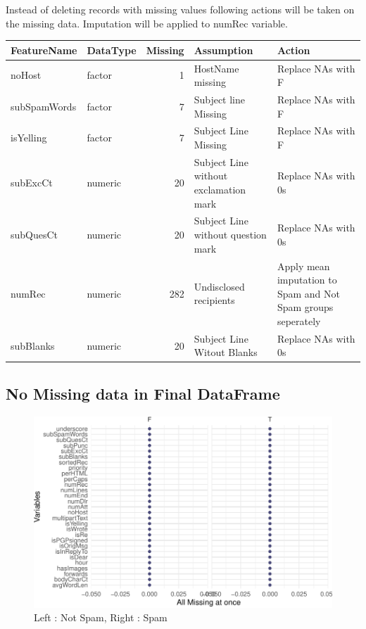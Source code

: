 \documentclass[
]{article}
\begin{document}
Instead of deleting records with missing values following actions will
be taken on the missing data. Imputation will be applied to numRec
variable.

\begin{table}[H]
\centering
\begin{tabular}[t]{llrl>{\raggedright\arraybackslash}p{15em}}
\toprule
FeatureName & DataType & Missing & Assumption & Action\\
\midrule
noHost & factor & 1 & HostName missing & Replace NAs with F\\
subSpamWords & factor & 7 & Subject line Missing & Replace NAs with F\\
isYelling & factor & 7 & Subject Line Missing & Replace NAs with F\\
subExcCt & numeric & 20 & Subject Line without exclamation mark & Replace NAs with 0s\\
subQuesCt & numeric & 20 & Subject Line without question mark & Replace NAs with 0s\\
\addlinespace
numRec & numeric & 282 & Undisclosed recipients & Apply mean imputation to Spam and Not Spam groups seperately\\
subBlanks & numeric & 20 & Subject Line Witout Blanks & Replace NAs with 0s\\
\bottomrule
\end{tabular}
\end{table}

\hypertarget{no-missing-data-in-final-dataframe}{%
\subsection{No Missing data in Final
DataFrame}\label{no-missing-data-in-final-dataframe}}

\begin{figure}[H]

{\centering \includegraphics{case_study03_files/figure-latex/unnamed-chunk-11-1} 

}

\caption{Left : Not Spam, Right : Spam}\label{fig:unnamed-chunk-11}
\end{figure}
\end{document}
